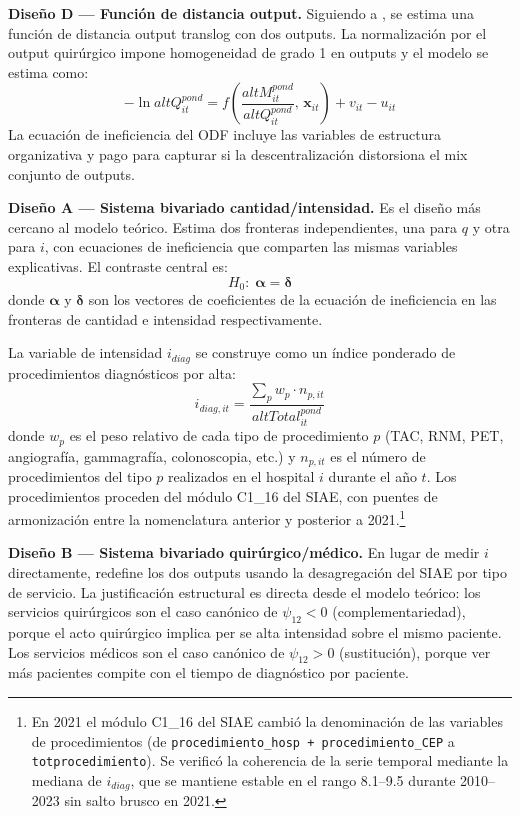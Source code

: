 \documentclass[12pt, a4paper]{article}
\newcommand{\bsym}[1]{\boldsymbol{#1}}
\begin{document}
\textbf{Diseño D --- Función de distancia output.}
Siguiendo a \citet{coelli1999}, se estima una función
de distancia output translog con dos outputs. La
normalización por el output quirúrgico impone
homogeneidad de grado 1 en outputs y el modelo se
estima como:
\begin{equation}
  -\ln altQ^{pond}_{it} = f\!\left(\frac{altM^{pond}_{it}}{altQ^{pond}_{it}},\, \mathbf{x}_{it}\right) + v_{it} - u_{it}
  \label{eq:odf}
\end{equation}
La ecuación de ineficiencia del ODF incluye las
variables de estructura organizativa y pago para
capturar si la descentralización distorsiona el mix
conjunto de outputs.

\textbf{Diseño A --- Sistema bivariado cantidad/intensidad.}
Es el diseño más cercano al modelo teórico. Estima dos
fronteras independientes, una para $q$ y otra para $i$,
con ecuaciones de ineficiencia que comparten las mismas
variables explicativas. El contraste central es:
\begin{equation}
  H_0:\; \bsym{\alpha} = \bsym{\delta}
  \label{eq:h0_p_star}
\end{equation}
donde $\bsym{\alpha}$ y $\bsym{\delta}$ son los vectores
de coeficientes de la ecuación de ineficiencia en las
fronteras de cantidad e intensidad respectivamente.

La variable de intensidad $i_{diag}$ se construye como
un índice ponderado de procedimientos diagnósticos por
alta:
\begin{equation}
  i_{diag,it} = \frac{\sum_p w_p \cdot n_{p,it}}{altTotal^{pond}_{it}}
  \label{eq:i_diag}
\end{equation}
donde $w_p$ es el peso relativo de cada tipo de
procedimiento $p$ (TAC, RNM, PET, angiografía,
gammagrafía, colonoscopia, etc.) y $n_{p,it}$ es el
número de procedimientos del tipo $p$ realizados en el
hospital $i$ durante el año $t$. Los procedimientos
proceden del módulo C1\_16 del SIAE, con puentes de
armonización entre la nomenclatura anterior y posterior
a 2021.\footnote{
  En 2021 el módulo C1\_16 del SIAE cambió la
  denominación de las variables de procedimientos
  (de \texttt{procedimiento\_hosp + procedimiento\_CEP}
  a \texttt{totprocedimiento}). Se verificó la coherencia
  de la serie temporal mediante la mediana de $i_{diag}$,
  que se mantiene estable en el rango 8.1--9.5 durante
  2010--2023 sin salto brusco en 2021.}

\textbf{Diseño B --- Sistema bivariado quirúrgico/médico.}
En lugar de medir $i$ directamente, redefine los dos
outputs usando la desagregación del SIAE por tipo de
servicio. La justificación estructural es directa desde
el modelo teórico: los servicios quirúrgicos son el
caso canónico de $\psi_{12} < 0$ (complementariedad),
porque el acto quirúrgico implica per se alta intensidad
sobre el mismo paciente. Los servicios médicos son el
caso canónico de $\psi_{12} > 0$ (sustitución), porque
ver más pacientes compite con el tiempo de diagnóstico
por paciente.
\end{document}
